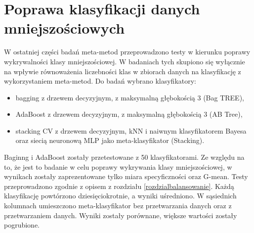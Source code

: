 \section{Poprawa klasyfikacji danych mniejszościowych}
W ostatniej części badań meta-metod przeprowadzono testy w kierunku poprawy wykrywalności klasy mniejszościowej. W badaniach tych skupiono się wyłącznie na wpływie równoważenia liczebności klas w zbiorach danych na klasyfikację z wykorzystaniem meta-metod. Do badań wybrano klasyfikatory: 
\begin{itemize}
	\item bagging z drzewem decyzyjnym, z maksymalną głębokością 3 (Bag TREE),
	\item AdaBoost z drzewem decyzyjnym, z maksymalną głębokością 3 (AB Tree),
	\item stacking CV z drzewem decyzyjnym, kNN i naiwnym klasyfikatorem Bayesa oraz siecią neuronową MLP jako meta-klasyfikator (Stacking).
\end{itemize}
Baginng i AdaBoost zostały przetestowane z 50 klasyfikatorami. Ze względu na to, że jest to badanie w celu poprawy wykrywania klasy mniejszościowej, w wynikach zostały zaprezentowane tylko miara specyficzności oraz G-mean. Testy przeprowadzono zgodnie z opisem z rozdziału \ref{rozdzialbalansowanie}. Każdą klasyfikację powtórzono dziesięciokrotnie, a wyniki uśredniono. W sąsiednich kolumnach umieszczono meta-klasyfikator bez przetwarzania danych oraz z przetwarzaniem danych. Wyniki zostały porównane, większe wartości zostały pogrubione.
